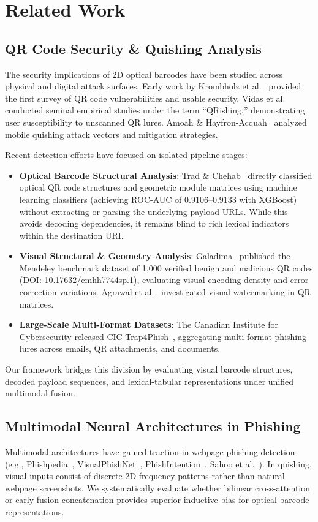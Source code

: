 \documentclass[conference]{IEEEtran}
\begin{document}
\section{Related Work}
\subsection{QR Code Security \& Quishing Analysis}
The security implications of 2D optical barcodes have been studied across physical and digital attack surfaces. Early work by Krombholz et al.~\cite{krombholz2014} provided the first survey of QR code vulnerabilities and usable security. Vidas et al.~\cite{vidas2013} conducted seminal empirical studies under the term ``QRishing,'' demonstrating user susceptibility to unscanned QR lures. Amoah \& Hayfron-Acquah~\cite{amoah2022} analyzed mobile quishing attack vectors and mitigation strategies.

Recent detection efforts have focused on isolated pipeline stages:
\begin{itemize}
    \item \textbf{Optical Barcode Structural Analysis}: Trad \& Chehab~\cite{trad2025} directly classified optical QR code structures and geometric module matrices using machine learning classifiers (achieving ROC-AUC of $0.9106\text{--}0.9133$ with XGBoost) without extracting or parsing the underlying payload URLs. While this avoids decoding dependencies, it remains blind to rich lexical indicators within the destination URI.
    \item \textbf{Visual Structural \& Geometry Analysis}: Galadima~\cite{galadima2025} published the Mendeley benchmark dataset of 1,000 verified benign and malicious QR codes (DOI: 10.17632/cmhh7744sp.1), evaluating visual encoding density and error correction variations. Agrawal et al.~\cite{agrawal2021} investigated visual watermarking in QR matrices.
    \item \textbf{Large-Scale Multi-Format Datasets}: The Canadian Institute for Cybersecurity released CIC-Trap4Phish~\cite{cic2025}, aggregating multi-format phishing lures across emails, QR attachments, and documents.
\end{itemize}
Our framework bridges this division by evaluating visual barcode structures, decoded payload sequences, and lexical-tabular representations under unified multimodal fusion.

\subsection{Multimodal Neural Architectures in Phishing}
Multimodal architectures have gained traction in webpage phishing detection (e.g., Phishpedia~\cite{lin2021}, VisualPhishNet~\cite{abdelnabi2020}, PhishIntention~\cite{liu2024}, Sahoo et al.~\cite{sahoo2017}). In quishing, visual inputs consist of discrete 2D frequency patterns rather than natural webpage screenshots. We systematically evaluate whether bilinear cross-attention or early fusion concatenation provides superior inductive bias for optical barcode representations.
\end{document}
